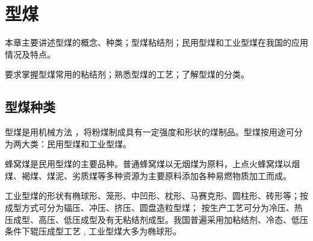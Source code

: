 \documentclass[10pt,openany]{ctexbook}
\begin{document}
\chapter{型煤}
本章主要讲述型煤的概念、种类；型煤粘结剂；民用型煤和工业型煤在我国的应用情况及特点。\par
要求掌握型煤常用的粘结剂；熟悉型煤的工艺；了解型煤的分类。
\section{型煤种类}
型煤是用机械方法 ，将粉煤制成具有一定强度和形状的煤制品。型煤按用途可分为两大类：民用型煤和工业型煤。\par
    蜂窝煤是民用型煤的主要品种。普通蜂窝煤以无烟煤为原料，上点火蜂窝煤以烟煤、褐煤、煤泥、劣质煤等多种资源为主要原料添加各种易燃物质加工而成。\par
    工业型煤的形状有椭球形、笼形、中凹形、枕形、马赛克形、圆柱形、砖形等；按成型方式可分为辐压、冲压、挤压、圆盘造粒型煤； 按生产工艺可分为冷压、热压成型、高压、低压成型及有无粘结剂成型。我国普遍采用加粘结剂、冷态、低压条件下辊压成型工艺 , 工业型煤大多为椭球形。\par
\end{document}
